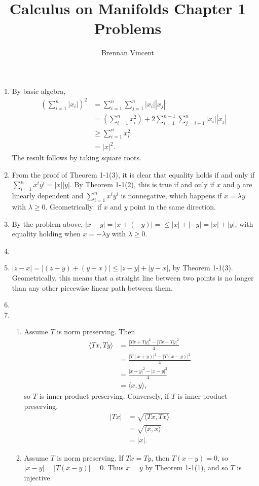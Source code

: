 \documentclass{article}
\title{Calculus on Manifolds Chapter 1 Problems}
\author{Brennan Vincent}
\begin{document}
\maketitle
\begin{enumerate}[label=\textbf{1-\arabic*.}]
\item By basic algebra,
\begin{align*}
	\left(\sum_{i=1}^n|x_i|\right)^2 &= \sum_{i=1}^n\sum_{j=1}^n|x_i||x_j|\\
		&= \left(\sum_{i=1}^n x_i^2\right) + 2\sum_{i=1}^{n-1}\sum_{j=i+1}^n |x_i||x_j|\\
		&\geq \sum_{i=1}^n x_i^2\\
		&= |x|^2.
\end{align*}
The result follows by taking square roots.
\item
	From the proof of Theorem 1-1(3), it is clear that equality holds if and only if $\sum_{i=1}^n x^i y^i = |x|\dot|y|$. By Theorem 1-1(2), this is true if and only if $x$ and $y$ are linearly dependent and $\sum_{i=1}^n x^i y^i$ is nonnegative, which happens if $x=\lambda y$ with $\lambda \geq 0$. Geometrically: if $x$ and $y$ point in the same direction.
\item By the problem above, $|x-y|=|x+(-y)|=\leq |x| + |-y| = |x| + |y|$, with equality holding when $x=-\lambda y$ with $\lambda \geq 0$.
\item
\item $|z-x| = |(z-y) + (y - x)| \leq |z-y|+|y-x|$, by Theorem 1-1(3). Geometrically, this means that a straight line between two points is no longer than any other piecewise linear path between them.
\item
\item
\begin{enumerate}
\item Assume $T$ is norm preserving. Then
\begin{align*}
\langle Tx,Ty\rangle &= \frac{|Tx+Ty|^2-|Tx-Ty|^2}{4}\\
	&= \frac{|T(x+y)|^2-|T(x-y)|^2}{4}\\
	&= \frac{|x+y|^2 - |x-y|^2}{4}\\
	&= \langle x, y \rangle,
\end{align*}
so $T$ is inner product preserving. Conversely, if $T$ is inner product preserving,
\begin{align*}
|Tx| &= \sqrt{\langle Tx,Tx\rangle}\\
	&= \sqrt{\langle x,x\rangle}\\
	&= |x|.
\end{align*}
\item Assume $T$ is norm preserving. If $Tx = Ty$, then $T(x-y) = 0$, so $|x-y|=|T(x-y)|=0$. Thus $x=y$ by Theorem 1-1(1), and so $T$ is injective.


\end{enumerate}
\end{enumerate}
\end{document}
